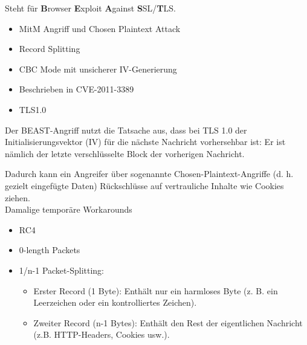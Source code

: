 Steht für \textbf{B}rowser \textbf{E}xploit \textbf{A}gainst \textbf{S}SL/\textbf{T}LS.
\begin{itemize}
    \item MitM Angriff und Chosen Plaintext Attack
    \item Record Splitting
    \item CBC Mode mit unsicherer IV-Generierung
    \item Beschrieben in CVE-2011-3389
    \item TLS1.0
\end{itemize}

Der BEAST-Angriff nutzt die Tatsache aus, dass bei TLS 1.0 der
Initialisierungsvektor (IV) für die nächste Nachricht vorhersehbar ist:
Er ist nämlich der letzte verschlüsselte Block der vorherigen Nachricht.

Dadurch kann ein Angreifer über sogenannte Chosen-Plaintext-Angriffe (d. h. gezielt eingefügte Daten) Rückschlüsse auf vertrauliche
Inhalte wie Cookies ziehen. \\

\noindent Damalige temporäre Workarounds
\begin{itemize}
    \item RC4
    \item 0-length Packets
    \item 1/n-1 Packet-Splitting: 
    \begin{itemize}
        \item Erster Record (1 Byte): Enthält nur ein harmloses Byte (z. B. ein Leerzeichen oder ein kontrolliertes Zeichen).
        \item Zweiter Record (n-1 Bytes): Enthält den Rest der eigentlichen Nachricht (z.B. HTTP-Headers, Cookies usw.).
    \end{itemize}
\end{itemize}
 

